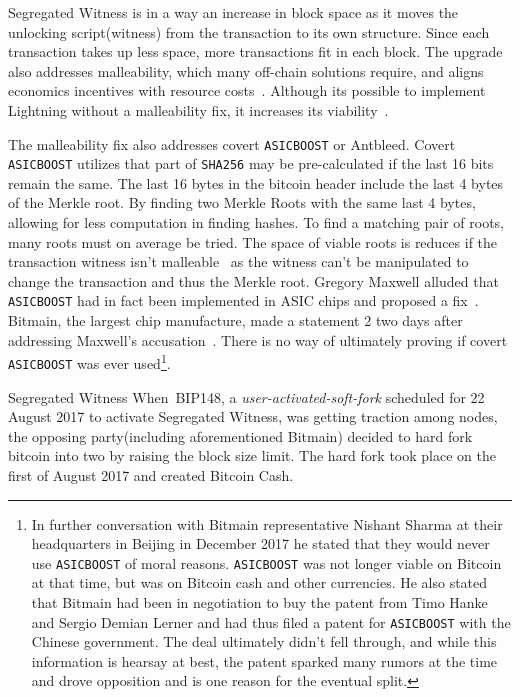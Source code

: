 Segregated Witness is in a way an increase in block space as it moves the unlocking script(witness) from the transaction to its own structure. Since each transaction takes up less space, more transactions fit in each block. The upgrade also addresses malleability, which many off-chain solutions require, and aligns economics incentives with resource costs~\cite{antonopoulos:segregated:witness:align:economic:incentives}. Although its possible to implement Lightning without a malleability fix, it increases its viability~\cite{song:lightning:malleability}.

The malleability fix also addresses covert \texttt{ASICBOOST} or Antbleed. Covert \texttt{ASICBOOST} utilizes that part of \texttt{SHA256} may be pre-calculated if the last 16 bits remain the same. The last 16 bytes in the bitcoin header include the last 4 bytes of the Merkle root. By finding two Merkle Roots with the same last 4 bytes, allowing for less computation in finding hashes. To find a matching pair of roots, many roots must on average be tried. The space of viable roots is reduces if the transaction witness isn't malleable~\cite{song:asicboost} as the witness can't be manipulated to change the transaction and thus the Merkle root. Gregory Maxwell alluded that \texttt{ASICBOOST} had in fact been implemented in ASIC chips and proposed a fix~\cite{maxwell:asicboost:fix}. Bitmain, the largest chip manufacture, made a statement 2 two days after addressing Maxwell's accusation~\cite{bitmain:response}. There is no way of ultimately proving if covert \texttt{ASICBOOST} was ever used\footnote{In further conversation with Bitmain representative Nishant Sharma at their headquarters in Beijing in December 2017 he stated that they would never use \texttt{ASICBOOST} of moral reasons. \texttt{ASICBOOST} was not longer viable on Bitcoin at that time, but was on Bitcoin cash and other currencies. He also stated that Bitmain had been in negotiation to buy the patent from Timo Hanke and Sergio Demian Lerner and had thus filed a patent for \texttt{ASICBOOST} with the Chinese government. The deal ultimately didn't fell through, and while this information is hearsay at best, the patent sparked many rumors at the time and drove opposition and is one reason for the eventual split.}. 

Segregated Witness When~BIP148\cite{bip:148:uasf:segwit}, a \textit{user-activated-soft-fork} scheduled for 22 August 2017 to activate Segregated Witness, was getting traction among nodes, the opposing party(including aforementioned Bitmain) decided to hard fork bitcoin into two by raising the block size limit. The hard fork took place on the first of August 2017 and created Bitcoin Cash.

